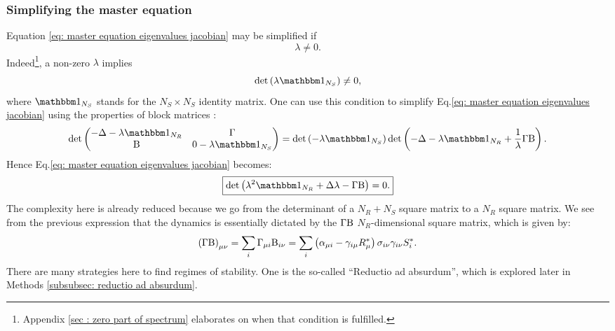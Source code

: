 \documentclass[12pt, titlepage]{report}
\begin{document}
\subsubsection{Simplifying the master equation}\label{section: non marginal equilibria}
Equation \eqref{eq: master equation eigenvalues jacobian} may be simplified if
\begin{equation}
\lambda \neq 0.
\end{equation}
Indeed\footnote{Appendix \ref{sec : zero part of spectrum} elaborates on when that condition is fulfilled.}, a non-zero $\lambda$ implies
\begin{equation}
\det\left(\lambda \identity{N_S}\right)\neq 0,
\end{equation}
where $\identity{N_S}$ stands for the $N_S \times N_S$ identity matrix. One can use this condition to simplify Eq.\eqref{eq: master equation eigenvalues jacobian} using the properties of block matrices \cite{powell_calculating_2011}:
\begin{equation}
\det
\begin{pmatrix}
  -\Delta - \lambda \identity{N_R}  & \Gamma \\
  \Beta & 0-\lambda \identity{N_S}
\end{pmatrix} =
\det\left(-\lambda \identity{N_S}\right)\det\left(-\Delta- \lambda\identity{N_R}+\frac{1}{\lambda}\Gamma \Beta\right).
\end{equation}
Hence Eq.\eqref{eq: master equation eigenvalues jacobian} becomes:
\begin{equation}
\boxed{
\det\left(\lambda^2 \identity{N_R}+\Delta \lambda-\Gamma \Beta\right)=0. \label{eq: master equation non marginal}
}
\end{equation}
The complexity here is already reduced because we go from the determinant of a $N_R+N_S$ square matrix to a $N_R$ square matrix. We see from the previous expression that the dynamics is essentially dictated by the $\Gamma \text{B}$ $N_R$-dimensional square matrix, which is given by:
\begin{equation}
\left(\Gamma \text{B}\right)_{\mu \nu} = \sum_i \Gamma_{\mu i} \text{B}_{i \nu} = \sum_i \left(\alpha_{\mu i}-\gamma_{i \mu} R^*_\mu \right)\sigma_{i\nu}\gamma_{i\nu}S^*_i. \label{eq : definition Gamma Beta}
\end{equation}
There are many strategies here to find regimes of stability. One is the so-called ``Reductio ad absurdum'', which is explored later in Methods \ref{subsubsec: reductio ad absurdum}.
\end{document}
